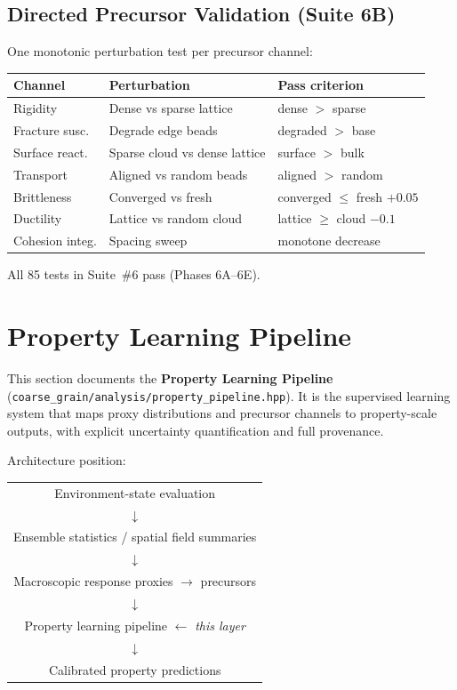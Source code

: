 \documentclass[11pt]{article}
\newcommand{\file}[1]{\texttt{#1}}
\begin{document}
\subsection{Directed Precursor Validation (Suite 6B)}

One monotonic perturbation test per precursor channel:

\begin{center}
\begin{tabular}{lll}
\textbf{Channel} & \textbf{Perturbation} & \textbf{Pass criterion} \\
\hline
Rigidity & Dense vs sparse lattice & dense $>$ sparse \\
Fracture susc. & Degrade edge beads & degraded $>$ base \\
Surface react. & Sparse cloud vs dense lattice & surface $>$ bulk \\
Transport & Aligned vs random beads & aligned $>$ random \\
Brittleness & Converged vs fresh & converged $\leq$ fresh $+ 0.05$ \\
Ductility & Lattice vs random cloud & lattice $\geq$ cloud $- 0.1$ \\
Cohesion integ. & Spacing sweep & monotone decrease \\
\end{tabular}
\end{center}

All 85 tests in Suite~\#6 pass (Phases 6A--6E).

\section{Property Learning Pipeline}
\label{sec:property_pipeline}

This section documents the \textbf{Property Learning Pipeline}
(\file{coarse\_grain/analysis/property\_pipeline.hpp}).  It is the
supervised learning system that maps proxy distributions and precursor
channels to property-scale outputs, with explicit uncertainty
quantification and full provenance.

Architecture position:
\begin{center}
\begin{tabular}{c}
Environment-state evaluation \\
$\downarrow$ \\
Ensemble statistics / spatial field summaries \\
$\downarrow$ \\
Macroscopic response proxies $\to$ precursors \\
$\downarrow$ \\
Property learning pipeline \quad $\leftarrow$ \textit{this layer} \\
$\downarrow$ \\
Calibrated property predictions
\end{tabular}
\end{center}
\end{document}
